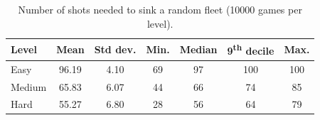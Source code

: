 \begin{table}[H]
    \centering
    \begin{tabular}{@{}l S[table-format=2.2] S[table-format=1.2] S[table-format=2.0]
            S[table-format=2.0] S[table-format=3.0] S[table-format=3.0]@{}}
        \toprule
        \textbf{Level}    & {\textbf{Mean}}                         & {\textbf{Std dev.}} & {\textbf{Min.}} &
        {\textbf{Median}} & {\textbf{9\textsuperscript{th} decile}} & {\textbf{Max.}}                                        \\
        \midrule
        Easy              & 96.19                                   & 4.10                & 69              & 97 & 100 & 100 \\
        Medium            & 65.83                                   & 6.07                & 44              & 66 & 74  & 85  \\
        Hard              & 55.27                                   & 6.80                & 28              & 56 & 64  & 79  \\
        \bottomrule
    \end{tabular}
    \caption{Number of shots needed to sink a random fleet (\num{10000} games per level).}
    \label{tab-solo}
\end{table}

